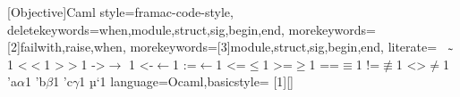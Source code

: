 

[Objective]{Caml}{%
style=framac-code-style,%
deletekeywords={when,module,struct,sig,begin,end},%
morekeywords=[2]{failwith,raise,when},%
morekeywords=[3]{module,struct,sig,begin,end},%
literate=%
{~}{${\scriptstyle\thicksim}$}1%
{<}{$<$}1%
{>}{$>$}1%
{->}{$\rightarrow$ }1%
{<-}{$\leftarrow$}1%
{:=}{$\leftarrow$}1%
{<=}{$\leq$}1%
{>=}{$\geq$}1%
{==}{$\equiv$}1%
{!=}{$\not\equiv$}1%
{<>}{$\neq$}1%
{'a}{$\alpha$}1%
{'b}{$\beta$}1%
{'c}{$\gamma$}1%
{µ}{`{}}1%
}
%
{language=Ocaml,basicstyle=\ifmmode\normalfont\mathtt\scriptstyle\else\normalfont\ttfamily\mdseries\small\fi}
\newcommand{\ocamlinput}[2][]{}
[1][]{\lstset{style=ocaml-basic,#1}}{}
